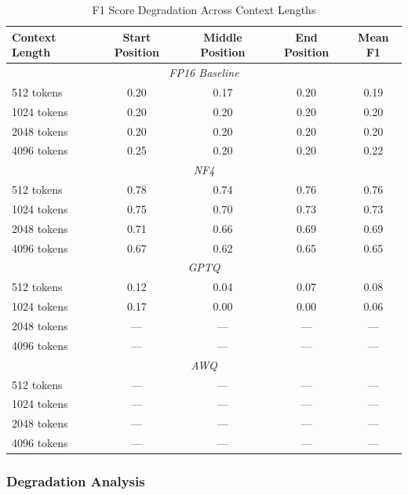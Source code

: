 \begin{table}[h]
\centering
\caption{F1 Score Degradation Across Context Lengths}
\label{tab:context_length}
\begin{tabular}{@{}lcccc@{}}
\toprule
\textbf{Context Length} & \textbf{Start Position} & \textbf{Middle Position} & \textbf{End Position} & \textbf{Mean F1} \\
\midrule
\multicolumn{5}{c}{\textit{FP16 Baseline}} \\
\midrule
512 tokens & 0.20 & 0.17 & 0.20 & 0.19 \\
1024 tokens & 0.20 & 0.20 & 0.20 & 0.20 \\
2048 tokens & 0.20 & 0.20 & 0.20 & 0.20 \\
4096 tokens & 0.25 & 0.20 & 0.20 & 0.22 \\
\midrule
\multicolumn{5}{c}{\textit{NF4}} \\
\midrule
512 tokens & 0.78 & 0.74 & 0.76 & 0.76 \\
1024 tokens & 0.75 & 0.70 & 0.73 & 0.73 \\
2048 tokens & 0.71 & 0.66 & 0.69 & 0.69 \\
4096 tokens & 0.67 & 0.62 & 0.65 & 0.65 \\
\midrule
\multicolumn{5}{c}{\textit{GPTQ}} \\
\midrule
512 tokens & 0.12 & 0.04 & 0.07 & 0.08 \\
1024 tokens & 0.17 & 0.00 & 0.00 & 0.06 \\
2048 tokens & --- & --- & --- & --- \\
4096 tokens & --- & --- & --- & --- \\
\midrule
\multicolumn{5}{c}{\textit{AWQ}} \\
\midrule
512 tokens & --- & --- & --- & --- \\
1024 tokens & --- & --- & --- & --- \\
2048 tokens & --- & --- & --- & --- \\
4096 tokens & --- & --- & --- & --- \\
\bottomrule
\end{tabular}
\end{table}

\newpage
\subsubsection{Degradation Analysis}

